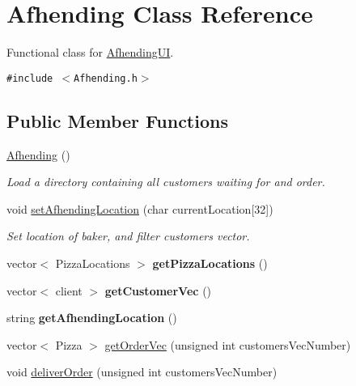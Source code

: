 \hypertarget{class_afhending}{
\section{Afhending Class Reference}
\label{class_afhending}
}
Functional class for \hyperlink{class_afhending_u_i}{Afhending\-UI}.  


{\tt \#include $<$Afhending.h$>$}

\subsection*{Public Member Functions}
\begin{CompactItemize}
\item 
\hypertarget{class_afhending_9365433a6f973ad929ffc0b458bc7c6f}{
\hyperlink{class_afhending_9365433a6f973ad929ffc0b458bc7c6f}{Afhending} ()}
\label{class_afhending_9365433a6f973ad929ffc0b458bc7c6f}

\begin{CompactList}\small\item\em Load a directory containing all customers waiting for and order. \item\end{CompactList}\item 
void \hyperlink{class_afhending_411cc45b50d4a59a33d76f6c54e52f78}{set\-Afhending\-Location} (char current\-Location\mbox{[}32\mbox{]})
\begin{CompactList}\small\item\em Set location of baker, and filter customers vector. \item\end{CompactList}\item 
\hypertarget{class_afhending_3d38e7498fba59674c7d3838bf4c1824}{
vector$<$ Pizza\-Locations $>$ {\bf get\-Pizza\-Locations} ()}
\label{class_afhending_3d38e7498fba59674c7d3838bf4c1824}

\item 
\hypertarget{class_afhending_3970b0afe27b514282442b11592e1602}{
vector$<$ client $>$ {\bf get\-Customer\-Vec} ()}
\label{class_afhending_3970b0afe27b514282442b11592e1602}

\item 
\hypertarget{class_afhending_543bc751e47e95a5382a13e161387a1b}{
string {\bf get\-Afhending\-Location} ()}
\label{class_afhending_543bc751e47e95a5382a13e161387a1b}

\item 
vector$<$ Pizza $>$ \hyperlink{class_afhending_ad0cbeddec394b25c5eade57247f4110}{get\-Order\-Vec} (unsigned int customers\-Vec\-Number)
\item 
void \hyperlink{class_afhending_1d223b1559fc42935dfef28841735951}{deliver\-Order} (unsigned int customers\-Vec\-Number)
\end{CompactItemize}
